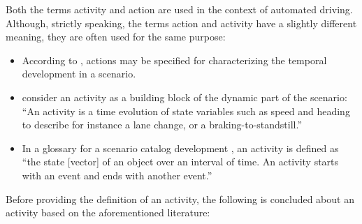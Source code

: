 Both the terms activity \autocite{geyer2014, elrofai2018scenario, childress2015using, catapult2018musicc, sigsim2019glossary} and action \autocite{geyer2014, ulbrich2015, bagschik2017ontology} are used in the context of automated driving. Although, strictly speaking, the terms action and activity have a slightly different meaning, they are often used for the same purpose:
\begin{itemize}
	\item According to \textcite{ulbrich2015}, actions may be specified for characterizing the temporal development in a scenario.
	\item \textcite{elrofai2018scenario} consider an activity as a building block of the dynamic part of the scenario: ``An activity is a time evolution of state variables such as speed and heading to describe for instance a lane change, or a braking-to-standstill.''
	\item In a glossary for a scenario catalog development \autocite{catapult2018musicc}, an activity is defined as ``the state [vector] of an object over an interval of time. An activity starts with an event and ends with another event.''
\end{itemize}


Before providing the definition of an activity, the following is concluded about an activity based on the aforementioned literature:

